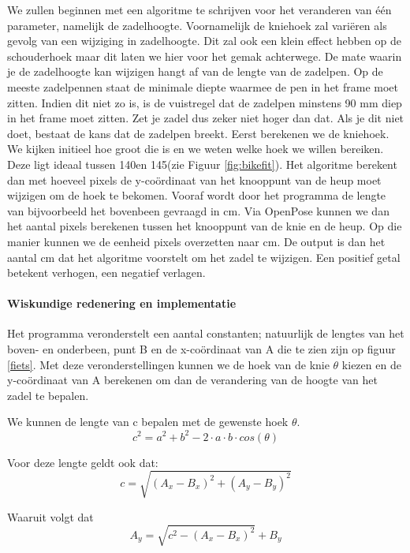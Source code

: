 \documentclass[a4paper,twoside,kulak]{kulakreport}
\begin{document}
We zullen beginnen met een algoritme te schrijven voor het veranderen van één parameter, namelijk de zadelhoogte. Voornamelijk de kniehoek zal variëren als gevolg van een wijziging in zadelhoogte. Dit zal ook een klein effect hebben op de schouderhoek maar dit laten we hier voor het gemak achterwege. De mate waarin je de zadelhoogte kan wijzigen hangt af van de lengte van de zadelpen. Op de meeste zadelpennen staat de minimale diepte waarmee de pen in het frame moet zitten. Indien dit niet zo is, is de vuistregel dat de zadelpen minstens 90 \si{mm} diep in het frame moet zitten. Zet je zadel dus zeker niet hoger dan dat. Als je dit niet doet, bestaat de kans dat de zadelpen breekt.
Eerst berekenen we de kniehoek. We kijken initieel hoe groot die is en we weten welke hoek we willen bereiken. Deze ligt ideaal tussen 140\degree en 145\degree (zie Figuur \ref{fig:bikefit}). Het algoritme berekent dan met hoeveel pixels de y-coördinaat van het knooppunt van de heup moet wijzigen om de hoek te bekomen. Vooraf wordt door het programma de lengte van bijvoorbeeld het bovenbeen gevraagd in \si{cm}. Via OpenPose kunnen we dan het aantal pixels berekenen tussen het knooppunt van de knie en de heup. Op die manier kunnen we de eenheid pixels overzetten naar \si{cm}. De output is dan het aantal \si{cm} dat het algoritme voorstelt om het zadel te wijzigen. Een positief getal betekent verhogen, een negatief verlagen.

\paragraph{Wiskundige redenering en implementatie}
Het programma veronderstelt een aantal constanten; natuurlijk de lengtes van het boven- en onderbeen, punt B en de x-coördinaat van A die te zien zijn op figuur \ref{fiets}. Met deze veronderstellingen kunnen we de hoek van de knie $\theta$ kiezen en de y-coördinaat van A berekenen om dan de verandering van de hoogte van het zadel te bepalen.

We kunnen de lengte van c bepalen met de gewenste hoek $\theta$.
\[c^2 = a^2 + b^2 -2\cdot a \cdot b \cdot cos(\theta)\]

Voor deze lengte geldt ook dat:
\[c = \sqrt{(A_x - B_x)^2 + (A_y - B_y)^2}\]

Waaruit volgt dat
\[A_y = \sqrt{c^2 - (A_x - B_x)^2} + B_y\]
\end{document}
